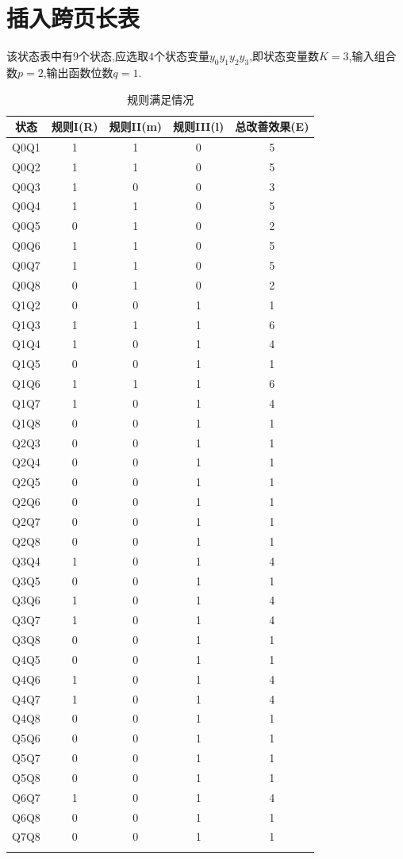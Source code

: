 \documentclass[
	12pt, %
	cn, %
]{mwhw}
\begin{document}
\section*{插入跨页长表}
该状态表中有$9$个状态,应选取$4$个状态变量$y_0y_1y_2y_3$,即状态变量数$K=3$,输入组合数$p=2$,输出函数位数$q=1$.
\begin{longtable}[c]{@{}ccccc@{}}
\toprule
状态 & 规则I(R) & 规则II(m) & 规则III(l) & 总改善效果(E) \\* \midrule
\endhead
%
\bottomrule
\endfoot
%
\endlastfoot
%
Q0Q1 & 1 & 1 & 0 & 5 \\
Q0Q2 & 1 & 1 & 0 & 5 \\
Q0Q3 & 1 & 0 & 0 & 3 \\
Q0Q4 & 1 & 1 & 0 & 5 \\
Q0Q5 & 0 & 1 & 0 & 2 \\
Q0Q6 & 1 & 1 & 0 & 5 \\
Q0Q7 & 1 & 1 & 0 & 5 \\
Q0Q8 & 0 & 1 & 0 & 2 \\
Q1Q2 & 0 & 0 & 1 & 1 \\
Q1Q3 & 1 & 1 & 1 & 6 \\
Q1Q4 & 1 & 0 & 1 & 4 \\
Q1Q5 & 0 & 0 & 1 & 1 \\
Q1Q6 & 1 & 1 & 1 & 6 \\
Q1Q7 & 1 & 0 & 1 & 4 \\
Q1Q8 & 0 & 0 & 1 & 1 \\
Q2Q3 & 0 & 0 & 1 & 1 \\
Q2Q4 & 0 & 0 & 1 & 1 \\
Q2Q5 & 0 & 0 & 1 & 1 \\
Q2Q6 & 0 & 0 & 1 & 1 \\
Q2Q7 & 0 & 0 & 1 & 1 \\
Q2Q8 & 0 & 0 & 1 & 1 \\
Q3Q4 & 1 & 0 & 1 & 4 \\
Q3Q5 & 0 & 0 & 1 & 1 \\
Q3Q6 & 1 & 0 & 1 & 4 \\
Q3Q7 & 1 & 0 & 1 & 4 \\
Q3Q8 & 0 & 0 & 1 & 1 \\
Q4Q5 & 0 & 0 & 1 & 1 \\
Q4Q6 & 1 & 0 & 1 & 4 \\
Q4Q7 & 1 & 0 & 1 & 4 \\
Q4Q8 & 0 & 0 & 1 & 1 \\
Q5Q6 & 0 & 0 & 1 & 1 \\
Q5Q7 & 0 & 0 & 1 & 1 \\
Q5Q8 & 0 & 0 & 1 & 1 \\
Q6Q7 & 1 & 0 & 1 & 4 \\
Q6Q8 & 0 & 0 & 1 & 1 \\
Q7Q8 & 0 & 0 & 1 & 1 \\* \bottomrule
\caption{规则满足情况}
\label{tab:3}\\
\end{longtable}
\end{document}
